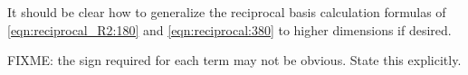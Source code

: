 
It should be clear how to generalize the reciprocal basis calculation formulas of
\cref{eqn:reciprocal_R2:180} and \cref{eqn:reciprocal:380} to higher dimensions if desired.

FIXME: the sign required for each term may not be obvious.  State this explicitly.


